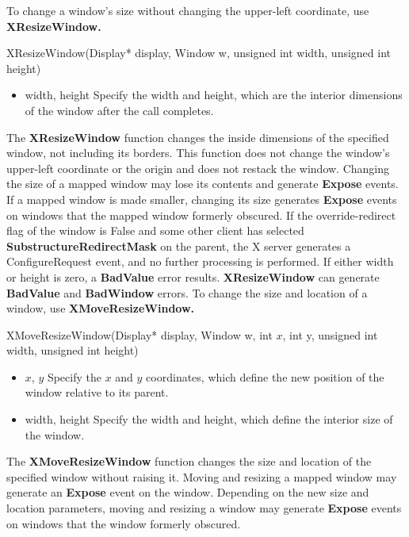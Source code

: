 \documentclass{report}
\begin{document}
\begin{itemize}
            To change a window’s size without changing the upper-left coordinate, use \textbf{XResizeWindow.}
            \bigbreak \noindent 
            \begin{cppcode}
                XResizeWindow(Display* display, Window w, unsigned int width, unsigned int height)
            \end{cppcode}
            \begin{itemize}
                \item width, height Specify the width and height, which are the interior dimensions of the window after the call completes.
            \end{itemize}
            The \textbf{XResizeWindow} function changes the inside dimensions of the specified window, not including its borders. This function does not change the window’s upper-left coordinate or the origin and does not restack the window. Changing the size of a mapped window may lose its contents and generate \textbf{Expose} events. If a mapped window is made smaller, changing its size generates \textbf{Expose} events on windows that the mapped window formerly obscured.
            \bigbreak \noindent 
            If the override-redirect flag of the window is False and some other client has selected \textbf{SubstructureRedirectMask} on the parent, the X server generates a ConfigureRequest event, and no further processing is performed. If either width or height is zero, a \textbf{BadValue} error results.
            \textbf{XResizeWindow} can generate \textbf{BadValue} and \textbf{BadWindow} errors.
            \bigbreak \noindent 
            To change the size and location of a window, use \textbf{XMoveResizeWindow.}
            \bigbreak \noindent 
            \begin{cppcode}
                XMoveResizeWindow(Display* display, Window w, int $x$, int y, unsigned int width, unsigned int height)
            \end{cppcode}
            \begin{itemize}
                \item $x$, $y$ Specify the $x$ and $y$ coordinates, which define the new position of the window relative to its parent.
                \item width, height Specify the width and height, which define the interior size of the window.
            \end{itemize}
            The \textbf{XMoveResizeWindow} function changes the size and location of the specified window without raising it. Moving and resizing a mapped window may generate an \textbf{Expose} event on the window. Depending on the new size and location parameters, moving and resizing a window may generate \textbf{Expose} events on windows that the window formerly obscured.

\end{itemize}
\end{document}
